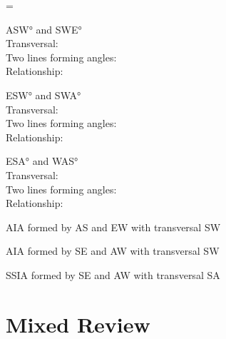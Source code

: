 \begin{exercises}
\begin{ex}
	\begin{center}
	\end{center}
	
	\begin{exparts}
	\itemsep = \smallskipamount
	\item \ang{ASW} and \ang{SWE}\\
	Transversal:\\
	Two lines forming angles:\\
	Relationship:
	\item \ang{ESW} and \ang{SWA}\\
	Transversal:\\
	Two lines forming angles:\\
	Relationship:
	\item \ang{ESA} and \ang{WAS}\\
	Transversal:\\
	Two lines forming angles:\\
	Relationship:
	\end{exparts}
	
	\begin{sol}
	\hspace*{\fill}
	\begin{exparts}
	\item AIA formed by \lin AS and \lin EW with transversal \lin SW
	\item AIA formed by \lin SE and \lin AW with transversal \lin SW
	\item SSIA formed by \lin SE and \lin AW with transversal \lin SA
	\end{exparts}
	\end{sol}
	\end{ex}
	
\end{exercises}

\section{Mixed Review}

